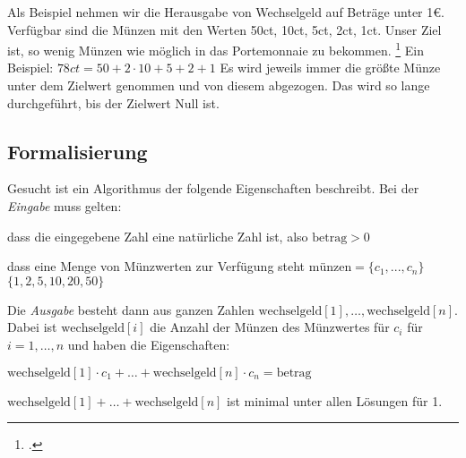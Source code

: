 \documentclass{bschlangaul-aufgabe}
\begin{document}

Als Beispiel nehmen wir die Herausgabe von Wechselgeld auf Beträge unter
1€. Verfügbar sind die Münzen mit den Werten 50ct, 10ct, 5ct, 2ct, 1ct.
Unser Ziel ist, so wenig Münzen wie möglich in das Portemonnaie zu
bekommen.
\footcite{net:html:wikiversity:wechselgeld}
%
Ein Beispiel: $78ct = 50 + 2 \cdot 10 + 5 + 2 + 1$
%
Es wird jeweils immer die größte Münze unter dem Zielwert genommen und
von diesem abgezogen. Das wird so lange durchgeführt, bis der Zielwert
Null ist.

%

\subsection{Formalisierung}

Gesucht ist ein Algorithmus der folgende Eigenschaften beschreibt.
Bei der \emph{Eingabe} muss gelten:

\bigskip

\begin{compactenum}
\item dass die eingegebene Zahl eine natürliche Zahl ist, also
$\text{betrag} > 0$

\item dass eine Menge von Münzwerten zur Verfügung steht $
\text{münzen}=\{c_1,...,c_n\}$ \zB $\{1,2,5,10,20,50\}$
\end{compactenum}

\bigskip

\noindent
Die \emph{Ausgabe} besteht dann aus ganzen Zahlen
$\text{wechselgeld}[1], \ldots ,\text{wechselgeld}[n]$.
Dabei ist $\text{wechselgeld}[i] $ die Anzahl der Münzen
des Münzwertes für $ c_i $ für $ i=1,\ldots,n $ und haben die
Eigenschaften:

\bigskip

\begin{compactenum}
\item $\text{wechselgeld}[1] \cdot c_1 + \ldots +
\text{wechselgeld}[n] \cdot c_n = \text{betrag}$

\item $\text{wechselgeld}[1] + \ldots + \text{wechselgeld}[n] $
ist minimal unter allen Lösungen für 1.
\end{compactenum}

%

\begin{bAntwort}
\end{bAntwort}
\end{document}
